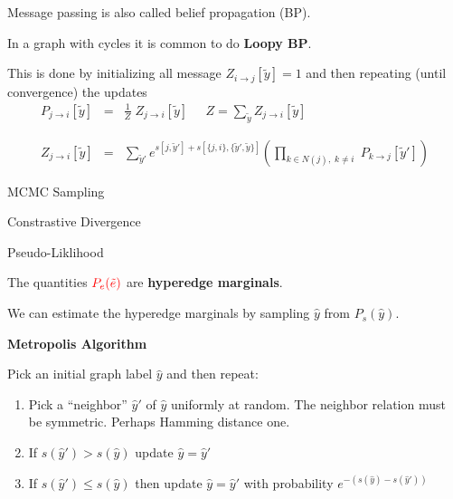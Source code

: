 {

Message passing is also called belief propagation (BP).

\vfill
In a graph with cycles it is common to do {\bf Loopy BP}.

\vfill
This is done by initializing all message $Z_{i \rightarrow j}[\tilde{y}] = 1$ and then repeating (until convergence) the updates
\vfill
\begin{eqnarray*}
  P_{j \rightarrow i}[\tilde{y}] & = & \frac{1}{Z}\;Z_{j \rightarrow i}[\tilde{y}] \;\;\;\;\;Z = \sum_{\tilde{y}} Z_{j \rightarrow i}[\tilde{y}] \\
  \\
  \\
  Z_{j\rightarrow i}[\tilde{y}] & = & \sum_{\tilde{y}'}  e^{s[j,\tilde{y}'] + s[\{j,i\},\{\tilde{y}',\tilde{y}\}]}
    \left(\prod_{k \in N(j),\;k \not = i}\;P_{k\rightarrow j}[\tilde{y}']\right)
\end{eqnarray*}


MCMC Sampling

\vfill
Constrastive Divergence

\vfill
Pseudo-Liklihood


The quantities ${\color{red} P_e(\tilde{e})}$ are {\bf hyperedge marginals}.

\vfill
We can estimate the hyperedge marginals by sampling $\hat{y}$ from $P_s(\hat{y})$.


\centerline{\bf Metropolis Algorithm}

\vfill
Pick an initial graph label $\hat{y}$ and then repeat:

\begin{enumerate}
\item Pick a ``neighbor'' $\hat{y}'$ of $\hat{y}$ uniformly at random.  The neighbor relation must be symmetric.  Perhaps Hamming distance one.

  \vfill
\item If $s(\hat{y}') > s(\hat{y})$ update $\hat{y} = \hat{y}'$

  \vfill
\item If $s(\hat{y}') \leq s(\hat{y})$ then update $\hat{y} = \hat{y}'$ with probability $e^{-(s(\hat{y}) - s(\hat{y}'))}$
  \end{enumerate}  


}
